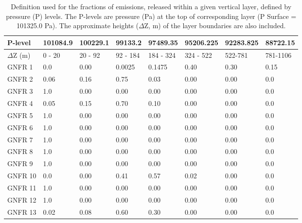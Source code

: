 \begin{table}[!h]
\begin{center}
\begin{footnotesize}
\caption{Definition used for the fractions of emissions, released within a given vertical
  layer, defined by pressure (P) levels. The P-levels are pressure (Pa) at
  the top of corresponding layer (P Surface = 101325.0 Pa). The
  approximate heights ($\Delta$Z, m) of the layer boundaries are also
  included.
\label{tab:emisH}
}
\begin{tabular}{llllllll}
\hline 
P-level &101084.9 &100229.1 &99133.2 &97489.35 &95206.225 &92283.825 &88722.15 \\
\hline
$\Delta$Z (m)& 0 - 20 & 20 - 92 & 92 - 184 & 184 - 324 & 324 - 522 & 522-781 & 781-1106\\
\hline
 GNFR 1  &0.0 &0.00  &0.0025 &0.1475 &0.40 &0.30 &0.15 \\
 GNFR 2  &0.06 &0.16 &0.75  &0.03  &0.00  &0.00  &0.0  \\
 GNFR 3  &1.0 &0.00  &0.00  &0.00  &0.00  &0.00  &0.0  \\
 GNFR 4  &0.05 &0.15 &0.70  &0.10  &0.00  &0.00  &0.0  \\
 GNFR 5  &1.0 &0.00  &0.00  &0.00  &0.00  &0.00  &0.0  \\
 GNFR 6  &1.0 &0.00  &0.00  &0.00  &0.00  &0.00  &0.0  \\
 GNFR 7  &1.0 &0.00  &0.00  &0.00  &0.00  &0.00  &0.0  \\
 GNFR 8  &1.0 &0.00  &0.00  &0.00  &0.00  &0.00  &0.0  \\
 GNFR 9  &1.0 &0.00  &0.00  &0.00  &0.00  &0.00  &0.0  \\
 GNFR 10 &0.0 &0.00  &0.41  &0.57  &0.02  &0.00  &0.0  \\
 GNFR 11 &1.0 &0.00  &0.00  &0.00  &0.00  &0.00  &0.0  \\
 GNFR 12 &1.0 &0.00  &0.00  &0.00  &0.00  &0.00  &0.0  \\
 GNFR 13 &0.02 &0.08 &0.60  &0.30  &0.00  &0.00  &0.0  \\
 \hline 
\end{tabular}
\end{footnotesize}
\end{center}
\end{table}



